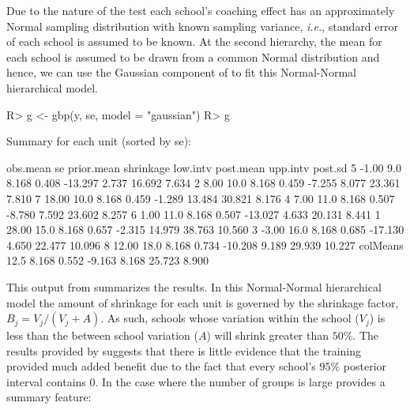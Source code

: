 \documentclass[article]{jss}
\begin{document}
Due to the nature of the test each school's coaching effect has an approximately Normal sampling distribution with known sampling variance, \emph{i.e.}, standard error of each school is assumed to be known. At the second hierarchy, the mean for each school is assumed to be drawn from a common Normal distribution and hence, we can use the Gaussian component of  to fit this Normal-Normal hierarchical model.


\begin{CodeChunk}
\begin{CodeInput}
R> g <- gbp(y, se, model = "gaussian")
R> g
\end{CodeInput}
\begin{CodeOutput}
Summary for each unit (sorted by se):

         obs.mean   se prior.mean shrinkage low.intv post.mean upp.intv post.sd
5           -1.00  9.0      8.168     0.408  -13.297     2.737   16.692   7.634
2            8.00 10.0      8.168     0.459   -7.255     8.077   23.361   7.810
7           18.00 10.0      8.168     0.459   -1.289    13.484   30.821   8.176
4            7.00 11.0      8.168     0.507   -8.780     7.592   23.602   8.257
6            1.00 11.0      8.168     0.507  -13.027     4.633   20.131   8.441
1           28.00 15.0      8.168     0.657   -2.315    14.979   38.763  10.560
3           -3.00 16.0      8.168     0.685  -17.130     4.650   22.477  10.096
8           12.00 18.0      8.168     0.734  -10.208     9.189   29.939  10.227
colMeans          12.5      8.168     0.552   -9.163     8.168   25.723   8.900
\end{CodeOutput}
\end{CodeChunk}
This output from  summarizes the results. In this Normal-Normal hierarchical model the amount of shrinkage for each unit is governed by the shrinkage factor, $B_j = V_j/(V_j + A)$. As such, schools whose variation within the school ($V_{j}$) is less than the between school variation ($A$) will shrink greater than $50\%$. The results provided by  suggests that there is little evidence that the training provided much added benefit due to the fact that every school's $95\%$ posterior interval contains 0. In the case where the number of groups is large  provides a summary feature:
\end{document}
